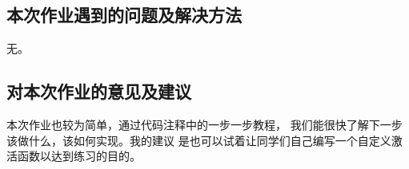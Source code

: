 \documentclass[a4paper]{article}
\begin{document}
\subsection{本次作业遇到的问题及解决方法}
无。
\subsection{对本次作业的意见及建议}
本次作业也较为简单，通过代码注释中的一步一步教程，
我们能很快了解下一步该做什么，该如何实现。我的建议
是也可以试着让同学们自己编写一个自定义激活函数以达到练习的目的。
\end{document}
